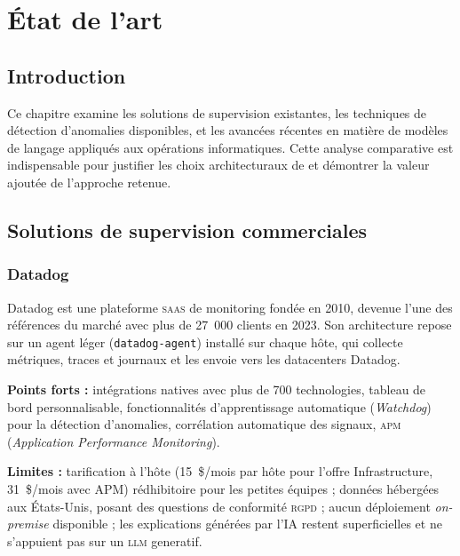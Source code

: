 \chapter{État de l'art}

\section*{Introduction}

Ce chapitre examine les solutions de supervision existantes, les techniques de
détection d'anomalies disponibles, et les avancées récentes en matière de modèles
de langage appliqués aux opérations informatiques. Cette analyse comparative est
indispensable pour justifier les choix architecturaux de \caimp{} et démontrer
la valeur ajoutée de l'approche retenue.

\section{Solutions de supervision commerciales}

\subsection{Datadog}

Datadog est une plateforme \textsc{saas} de monitoring fondée en 2010, devenue
l'une des références du marché avec plus de 27~000 clients en 2023.
Son architecture repose sur un agent léger (\texttt{datadog-agent}) installé
sur chaque hôte, qui collecte métriques, traces et journaux et les envoie
vers les datacenters Datadog.

\textbf{Points forts :} intégrations natives avec plus de 700 technologies,
tableau de bord personnalisable, fonctionnalités d'apprentissage automatique
(\textit{Watchdog}) pour la détection d'anomalies, corrélation automatique
des signaux, \textsc{apm} (\textit{Application Performance Monitoring}).

\textbf{Limites :} tarification à l'hôte (15~\$/mois par hôte pour l'offre
Infrastructure, 31~\$/mois avec APM) rédhibitoire pour les petites équipes ;
données hébergées aux États-Unis, posant des questions de conformité \textsc{rgpd} ;
aucun déploiement \textit{on-premise} disponible ; les explications générées
par l'IA restent superficielles et ne s'appuient pas sur un \textsc{llm} generatif.

